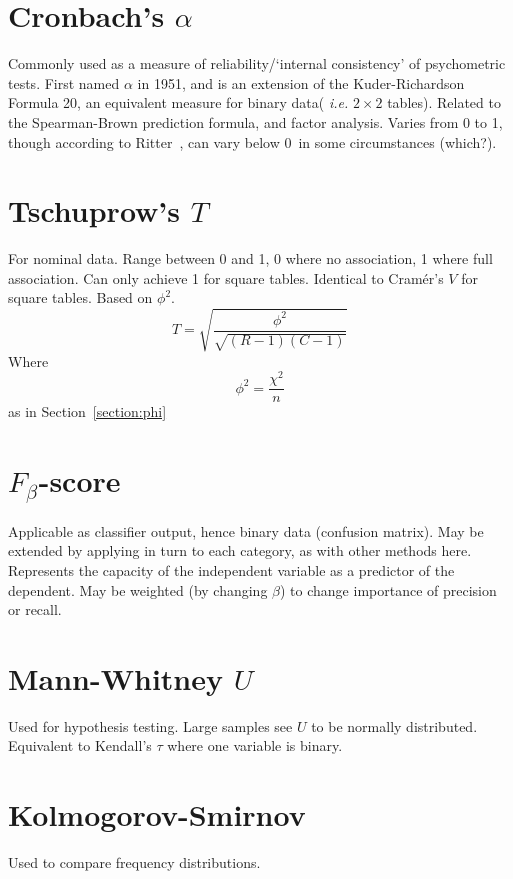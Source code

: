 \documentclass[11pt]{article}
\begin{document}
\section{Cronbach's $\alpha$}
Commonly used as a measure of reliability/`internal consistency' of psychometric tests.  First named $\alpha$ in 1951, and is an extension of the Kuder-Richardson Formula 20, an equivalent measure for binary data( \textsl{i.e.} $2\times 2$ tables).  Related to the Spearman-Brown prediction formula, and factor analysis.  Varies from 0 to 1, though according to Ritter~\cite{ritter2010understanding}, can vary below 0~in some circumstances {\color{red} (which?)}.




\section{Tschuprow's $T$}
For nominal data.  Range between 0 and 1, 0 where no association, 1 where full association.  Can only achieve 1 for square tables. Identical to Cram\'er's $V$ for square tables.  Based on $\phi^2$.
$$
T = \sqrt{ \frac{ \phi^2 }{ \sqrt{ (R-1)(C-1) } } }
$$
Where 
$$
\phi^2 = \frac{\chi^2}{n}
$$
as in Section~\ref{section:phi}




\section{$F_\beta$-score}
Applicable as classifier output, hence binary data (confusion matrix).  May be extended by applying in turn to each category, as with other methods here.  Represents the capacity of the independent variable as a predictor of the dependent.  May be weighted (by changing $\beta$) to change importance of precision or recall.




\section{Mann-Whitney $U$}
Used for hypothesis testing.  Large samples see $U$ to be normally distributed.  Equivalent to Kendall's $\tau$ where one variable is binary.  




\section{Kolmogorov-Smirnov}
Used to compare frequency distributions.
\end{document}
